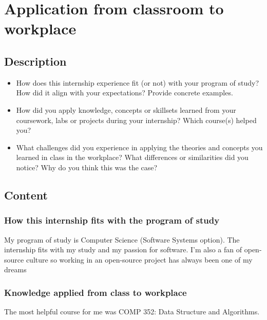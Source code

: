 \newpage
\section{Application from classroom to workplace}

\subsection{Description}

\begin{itemize}
    \item How does this internship experience fit (or not) with your program of study? How did it align with your expectations? Provide concrete examples.
    \item How did you apply knowledge, concepts or skillsets learned from your coursework, labs or projects during your internship? Which course(s) helped you?
    \item What challenges did you experience in applying the theories and concepts you learned in class in the workplace? What differences or similarities did you notice? Why do you think this was the case?
\end{itemize}

\subsection{Content}

\subsubsection{How this internship fits with the program of study}
My program of study is Computer Science (Software Systems option). The internship fits with my study and my passion for software.
I'm also a fan of open-source culture so working in an open-source project has always been one of my dreams

\subsubsection{Knowledge applied from class to workplace}
The most helpful course for me was COMP 352: Data Structure and Algorithms.

